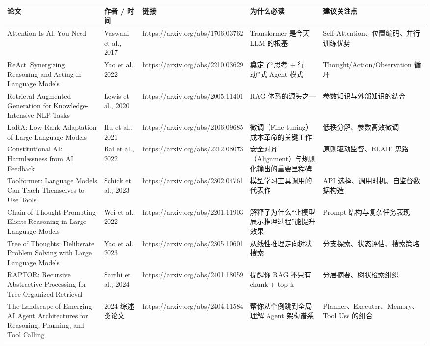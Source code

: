 \begingroup
\scriptsize
\setlength{\tabcolsep}{3pt}
\begin{longtable}{|p{}|p{}|p{}|p{}|p{}|}
\hline
论文 & 作者 / 时间 & 链接 & 为什么必读 & 建议关注点 \\ \hline
Attention Is All You Need & Vaswani et al., 2017 & https://arxiv.org/abs/1706.03762 & Transformer 是今天 LLM 的根基 & Self-Attention、位置编码、并行训练优势 \\ \hline
ReAct: Synergizing Reasoning and Acting in Language Models & Yao et al., 2022 & https://arxiv.org/abs/2210.03629 & 奠定了``思考 + 行动''式 Agent 模式 & Thought/Action/Observation 循环 \\ \hline
Retrieval-Augmented Generation for Knowledge-Intensive NLP Tasks & Lewis et al., 2020 & https://arxiv.org/abs/2005.11401 & RAG 体系的源头之一 & 参数知识与外部知识的结合 \\ \hline
LoRA: Low-Rank Adaptation of Large Language Models & Hu et al., 2021 & https://arxiv.org/abs/2106.09685 & 微调（Fine-tuning）成本革命的关键工作 & 低秩分解、参数高效微调 \\ \hline
Constitutional AI: Harmlessness from AI Feedback & Bai et al., 2022 & https://arxiv.org/abs/2212.08073 & 安全对齐（Alignment）与规则化输出的重要里程碑 & 原则驱动监督、RLAIF 思路 \\ \hline
Toolformer: Language Models Can Teach Themselves to Use Tools & Schick et al., 2023 & https://arxiv.org/abs/2302.04761 & 模型学习工具调用的代表作 & API 选择、调用时机、自监督数据构造 \\ \hline
Chain-of-Thought Prompting Elicits Reasoning in Large Language Models & Wei et al., 2022 & https://arxiv.org/abs/2201.11903 & 解释了为什么``让模型展示推理过程''能提升效果 & Prompt 结构与复杂任务表现 \\ \hline
Tree of Thoughts: Deliberate Problem Solving with Large Language Models & Yao et al., 2023 & https://arxiv.org/abs/2305.10601 & 从线性推理走向树状搜索 & 分支探索、状态评估、搜索策略 \\ \hline
RAPTOR: Recursive Abstractive Processing for Tree-Organized Retrieval & Sarthi et al., 2024 & https://arxiv.org/abs/2401.18059 & 提醒你 RAG 不只有 chunk + top-k & 分层摘要、树状检索组织 \\ \hline
The Landscape of Emerging AI Agent Architectures for Reasoning, Planning, and Tool Calling & 2024 综述类论文 & https://arxiv.org/abs/2404.11584 & 帮你从个例跳到全局理解 Agent 架构谱系 & Planner、Executor、Memory、Tool Use 的组合 \\ \hline
\end{longtable}
\endgroup

